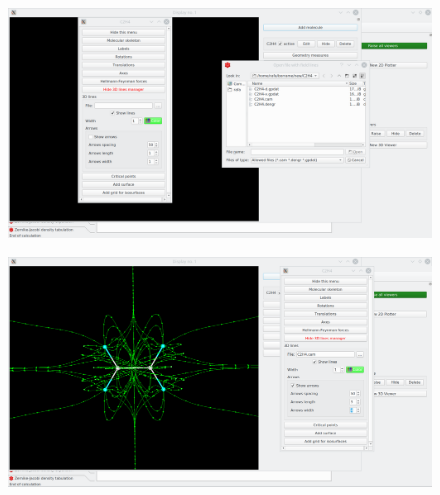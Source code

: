 \documentclass[a4paper,10pt]{article}
\begin{document}
\begin{minipage}{.5\linewidth}
\begin{figure}[H]
\caption{\label{fig:41}}
\begin{center}
\includegraphics[width=0.95\linewidth]{damqt_QS_fig41.png}
\end{center}
\end{figure} 
\end{minipage}
\begin{minipage}{.5\linewidth}
\begin{figure}[H]
\caption{\label{fig:42}}
\begin{center}
\includegraphics[width=0.95\linewidth]{damqt_QS_fig42.png}
\end{center}
\end{figure} 
\end{minipage}
\end{document}
